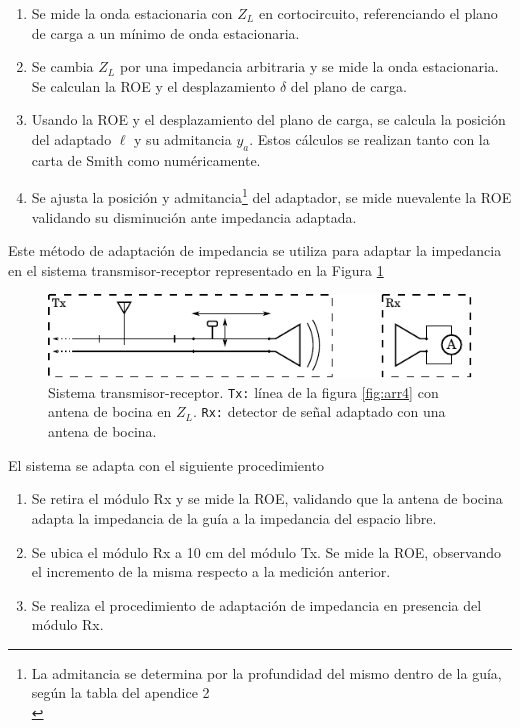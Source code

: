 \documentclass[11pt,a4paper]{article}
\begin{document}
\begin{multicols}{2}
\begin{enumerate}
    \item Se mide la onda estacionaria con $Z_L$ en cortocircuito, referenciando el plano de carga a un mínimo de onda estacionaria.
    \item Se cambia $Z_L$ por una impedancia arbitraria y se mide la onda estacionaria. Se calculan la ROE y el desplazamiento $\delta$ del plano de carga.
    \item Usando la ROE y el desplazamiento del plano de carga, se calcula la posición del adaptado $\ell$ y su admitancia $y_a$. 
    Estos cálculos se realizan tanto con la carta de Smith como numéricamente.
    \item Se ajusta la posición y admitancia\footnote{La admitancia se determina por la profundidad del mismo dentro de la guía, según la tabla del apendice 2\\[-2em]} del adaptador, se mide nuevalente la ROE validando su disminución ante impedancia adaptada.
\end{enumerate}

Este método de adaptación de impedancia se utiliza para adaptar la impedancia en el sistema transmisor-receptor representado en la Figura \ref{fig:sistema}

\begin{figure}[H]
    \centering
    \includegraphics[width=\linewidth]{Images/sistema.pdf}
    \caption{Sistema transmisor-receptor.
    \texttt{Tx:} línea de la figura \ref{fig:arr4} con antena de bocina en $Z_L$. 
    \texttt{Rx:} detector de señal adaptado con una antena de bocina.}
    \label{fig:sistema}
\end{figure}

El sistema se adapta con el siguiente procedimiento
\begin{enumerate}
    \item Se retira el módulo Rx y se mide la ROE, validando que la antena de bocina adapta la impedancia de la guía a la impedancia del espacio libre.
    \item Se ubica el módulo Rx a 10 cm del módulo Tx. Se mide la ROE, observando el incremento de la misma respecto a la medición anterior.
    \item Se realiza el procedimiento de adaptación de impedancia en presencia del módulo Rx.
\end{enumerate}


\end{multicols}
\end{document}
